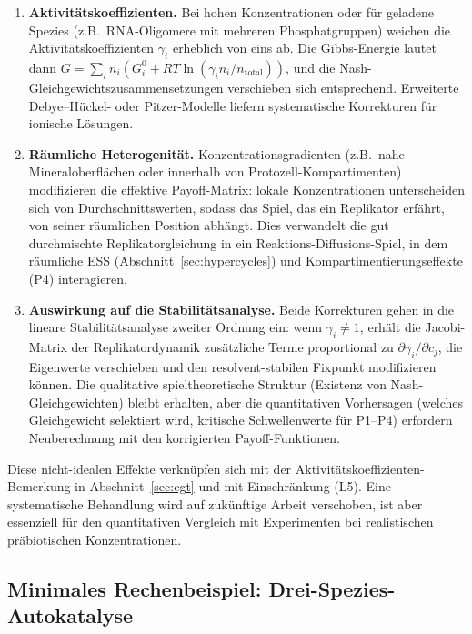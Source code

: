 \documentclass[12pt,a4paper]{article}
\theoremstyle{remark}
\begin{document}
\begin{enumerate}
    \item \textbf{Aktivitätskoeffizienten.} Bei hohen Konzentrationen oder für geladene Spezies (z.B.\ RNA-Oligomere mit mehreren Phosphatgruppen) weichen die Aktivitätskoeffizienten $\gamma_i$ erheblich von eins ab. Die Gibbs-Energie lautet dann $G = \sum_i n_i (G_i^0 + RT\ln(\gamma_i n_i / n_{\mathrm{total}}))$, und die Nash-Gleichgewichtszusammensetzungen verschieben sich entsprechend. Erweiterte Debye--Hückel- oder Pitzer-Modelle liefern systematische Korrekturen für ionische Lösungen.
    \item \textbf{Räumliche Heterogenität.} Konzentrationsgradienten (z.B.\ nahe Mineraloberflächen oder innerhalb von Protozell-Kompartimenten) modifizieren die effektive Payoff-Matrix: lokale Konzentrationen unterscheiden sich von Durchschnittswerten, sodass das Spiel, das ein Replikator erfährt, von seiner räumlichen Position abhängt. Dies verwandelt die gut durchmischte Replikatorgleichung in ein Reaktions-Diffusions-Spiel, in dem räumliche ESS (Abschnitt~\ref{sec:hypercycles}) und Kompartimentierungseffekte (P4) interagieren.
    \item \textbf{Auswirkung auf die Stabilitätsanalyse.} Beide Korrekturen gehen in die lineare Stabilitätsanalyse zweiter Ordnung ein: wenn $\gamma_i \neq 1$, erhält die Jacobi-Matrix der Replikatordynamik zusätzliche Terme proportional zu $\partial\gamma_i/\partial c_j$, die Eigenwerte verschieben und den resolvent-stabilen Fixpunkt modifizieren können. Die qualitative spieltheoretische Struktur (Existenz von Nash-Gleichgewichten) bleibt erhalten, aber die quantitativen Vorhersagen (welches Gleichgewicht selektiert wird, kritische Schwellenwerte für P1--P4) erfordern Neuberechnung mit den korrigierten Payoff-Funktionen.
\end{enumerate}

\noindent
Diese nicht-idealen Effekte verknüpfen sich mit der Aktivitätskoeffizienten-Bemerkung in Abschnitt~\ref{sec:cgt} und mit Einschränkung (L5). Eine systematische Behandlung wird auf zukünftige Arbeit verschoben, ist aber essenziell für den quantitativen Vergleich mit Experimenten bei realistischen präbiotischen Konzentrationen.

\subsection{Minimales Rechenbeispiel: Drei-Spezies-Autokatalyse}\label{sec:3species}
\end{document}
